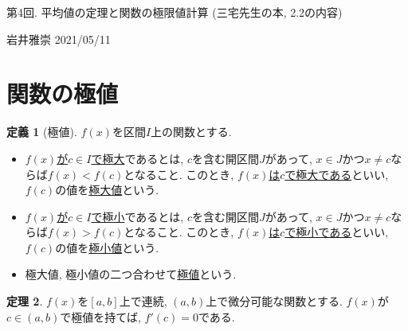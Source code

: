 \documentclass[dvipdfmx,a4paper,11pt]{article}
\theoremstyle{definition}
\newtheorem{thm}{定理}
\newtheorem{dfn}[thm]{定義}
\begin{document}
\begin{center}
{\Large 第4回. 平均値の定理と関数の極限値計算 (三宅先生の本, 2.2の内容)}
\end{center}

\begin{flushright}
 岩井雅崇 2021/05/11
\end{flushright}

\section{関数の極値}

\begin{tcolorbox}[
    colback = white,
    colframe = green!35!black,
    fonttitle = \bfseries,
    breakable = true]
    \begin{dfn}[極値]
$f(x)$を区間$I$上の関数とする.
\begin{itemize}
\item \underline{$f(x)$が$c\in I$で極大}であるとは, $c$を含む開区間$J$があって, $x \in J$かつ$x \neq c$ならば$f(x) < f(c)$となること.
このとき, \underline{$f(x)$は$c$で極大である}といい, $f(c)$の値を\underline{極大値}という.
\item \underline{$f(x)$が$c\in I$で極小}であるとは, $c$を含む開区間$J$があって, $x \in J$かつ$x \neq c$ならば$f(x) > f(c)$となること.
このとき, \underline{$f(x)$は$c$で極小である}といい, $f(c)$の値を\underline{極小値}という.
\item  極大値, 極小値の二つ合わせて\underline{極値}という.%
\end{itemize}

    \end{dfn}
\end{tcolorbox}

\begin{tcolorbox}[
    colback = white,
    colframe = green!35!black,
    fonttitle = \bfseries,
    breakable = true]
    \begin{thm}
    $f(x)$を$[a,b]$上で連続, $(a,b)$上で微分可能な関数とする.
    $f(x)$が$c \in (a,b)$で極値を持てば, $f'(c) = 0$である.
    \end{thm}
\end{tcolorbox}
\end{document}
